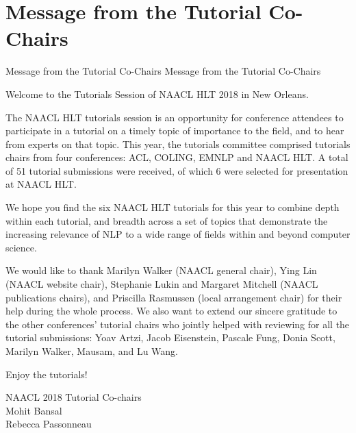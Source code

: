 \section{Message from the Tutorial Co-Chairs}\vspace{2em}
\setheaders%
    {Message from the Tutorial Co-Chairs}%
    {Message from the Tutorial Co-Chairs}
\thispagestyle{emptyheader}

\setlength{\parskip}{1ex}

Welcome to the Tutorials Session of NAACL HLT 2018 in New Orleans.

The NAACL HLT tutorials session is an opportunity for conference attendees to participate in a tutorial on a timely topic of importance to the field, and to hear from experts on that topic. This year, the tutorials committee comprised tutorials chairs from four conferences: ACL, COLING, EMNLP and NAACL HLT. A total of 51 tutorial submissions were received, of which 6 were selected for presentation at NAACL HLT.

We hope you find the six NAACL HLT tutorials for this year to combine depth within each tutorial, and breadth across a set of topics that demonstrate the increasing relevance of NLP to a wide range of fields within and beyond computer science.

We would like to thank Marilyn Walker (NAACL general chair), Ying Lin (NAACL website chair), Stephanie Lukin and Margaret Mitchell (NAACL publications chairs), and Priscilla Rasmussen (local arrangement chair) for their help during the whole process. We also want to extend our sincere gratitude to the other conferences' tutorial chairs who jointly helped with reviewing for all the tutorial submissions: Yoav Artzi, Jacob Eisenstein, Pascale Fung, 
Donia Scott, Marilyn Walker, Mausam, and Lu Wang.

Enjoy the tutorials!

\vskip 0.5in
\noindent
NAACL 2018 Tutorial Co-chairs\\
\noindent
Mohit Bansal \\
\noindent
Rebecca Passonneau\\

